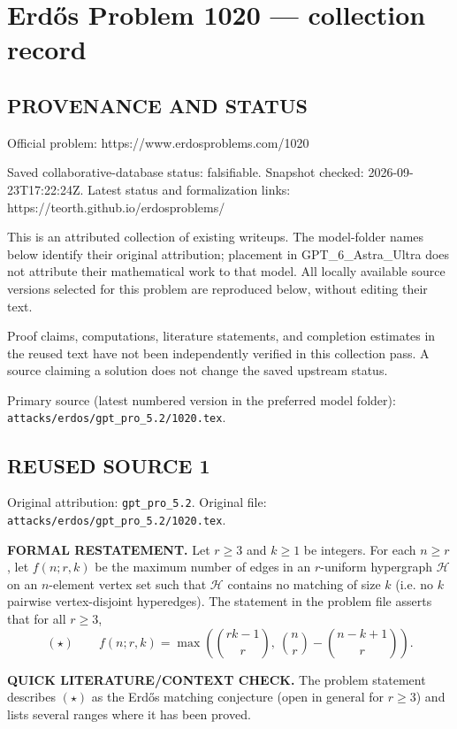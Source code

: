 \section*{Erd\H{o}s Problem 1020 --- collection record}

\subsection*{PROVENANCE AND STATUS}
Official problem: https://www.erdosproblems.com/1020

Saved collaborative-database status: falsifiable.
Snapshot checked: 2026-09-23T17:22:24Z.
Latest status and formalization links: https://teorth.github.io/erdosproblems/

This is an attributed collection of existing writeups. The model-folder names below identify their original attribution; placement in GPT\_6\_Astra\_Ultra does not attribute their mathematical work to that model. All locally available source versions selected for this problem are reproduced below, without editing their text.

Proof claims, computations, literature statements, and completion estimates in the reused text have not been independently verified in this collection pass. A source claiming a solution does not change the saved upstream status.

Primary source (latest numbered version in the preferred model folder): \texttt{attacks/erdos/gpt\_pro\_5.2/1020.tex}.

\subsection*{REUSED SOURCE 1}
Original attribution: \texttt{gpt\_pro\_5.2}.
Original file: \texttt{attacks/erdos/gpt\_pro\_5.2/1020.tex}.


\noindent\textbf{FORMAL RESTATEMENT.}
Let $r\ge 3$ and $k\ge 1$ be integers.
For each $n\ge r$, let $f(n;r,k)$ be the maximum number of edges in an $r$-uniform hypergraph $\mathcal{H}$ on an $n$-element vertex set such that $\mathcal{H}$ contains no matching of size $k$ (i.e. no $k$ pairwise vertex-disjoint hyperedges).
The statement in the problem file asserts that for all $r\ge 3$,
\[
(\star)\qquad f(n;r,k)=\max\left(\binom{rk-1}{r},\ \binom{n}{r}-\binom{n-k+1}{r}\right).
\]

\medskip
\noindent\textbf{QUICK LITERATURE/CONTEXT CHECK.}
The problem statement describes $(\star)$ as the Erd\H{o}s matching conjecture (open in general for $r\ge 3$) and lists several ranges where it has been proved.

